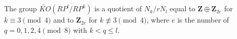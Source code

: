 The group $\tilde{KO}(RP^l/RP^k)$ is a quotient of $N_k/rN_l$ equal to $\mathbf{Z} \oplus \mathbf{Z}_{2e}$ for $k \equiv 3 \pmod{4}$ and to $\mathbf{Z}_{2e}$ for $k \not\equiv 3 \pmod{4}$, where $e$ is the number of $q = 0, 1, 2, 4 \pmod{8}$ with $k < q \leq l$.
